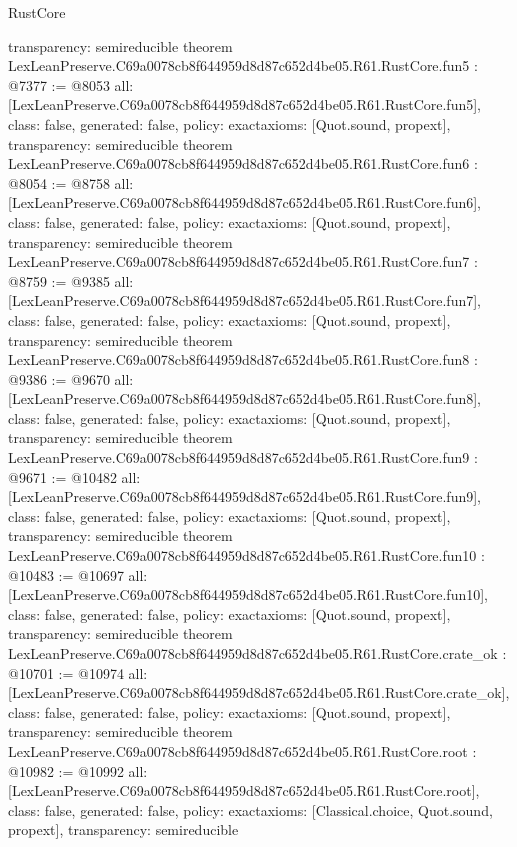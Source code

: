 \begin{lexlean}{RustCore}
\begin{coremodule}
{  transparency: semireducible
}
theorem LexLeanPreserve.C69a0078cb8f644959d8d87c652d4be05.R61.RustCore.fun5 : @7377 := @8053 {
  all: [LexLeanPreserve.C69a0078cb8f644959d8d87c652d4be05.R61.RustCore.fun5],
  class: false,
  generated: false,
  policy: exact{axioms: [Quot.sound, propext]},
  transparency: semireducible
}
theorem LexLeanPreserve.C69a0078cb8f644959d8d87c652d4be05.R61.RustCore.fun6 : @8054 := @8758 {
  all: [LexLeanPreserve.C69a0078cb8f644959d8d87c652d4be05.R61.RustCore.fun6],
  class: false,
  generated: false,
  policy: exact{axioms: [Quot.sound, propext]},
  transparency: semireducible
}
theorem LexLeanPreserve.C69a0078cb8f644959d8d87c652d4be05.R61.RustCore.fun7 : @8759 := @9385 {
  all: [LexLeanPreserve.C69a0078cb8f644959d8d87c652d4be05.R61.RustCore.fun7],
  class: false,
  generated: false,
  policy: exact{axioms: [Quot.sound, propext]},
  transparency: semireducible
}
theorem LexLeanPreserve.C69a0078cb8f644959d8d87c652d4be05.R61.RustCore.fun8 : @9386 := @9670 {
  all: [LexLeanPreserve.C69a0078cb8f644959d8d87c652d4be05.R61.RustCore.fun8],
  class: false,
  generated: false,
  policy: exact{axioms: [Quot.sound, propext]},
  transparency: semireducible
}
theorem LexLeanPreserve.C69a0078cb8f644959d8d87c652d4be05.R61.RustCore.fun9 : @9671 := @10482 {
  all: [LexLeanPreserve.C69a0078cb8f644959d8d87c652d4be05.R61.RustCore.fun9],
  class: false,
  generated: false,
  policy: exact{axioms: [Quot.sound, propext]},
  transparency: semireducible
}
theorem LexLeanPreserve.C69a0078cb8f644959d8d87c652d4be05.R61.RustCore.fun10 : @10483 := @10697 {
  all: [LexLeanPreserve.C69a0078cb8f644959d8d87c652d4be05.R61.RustCore.fun10],
  class: false,
  generated: false,
  policy: exact{axioms: [Quot.sound, propext]},
  transparency: semireducible
}
theorem LexLeanPreserve.C69a0078cb8f644959d8d87c652d4be05.R61.RustCore.crate_ok : @10701 := @10974 {
  all: [LexLeanPreserve.C69a0078cb8f644959d8d87c652d4be05.R61.RustCore.crate_ok],
  class: false,
  generated: false,
  policy: exact{axioms: [Quot.sound, propext]},
  transparency: semireducible
}
theorem LexLeanPreserve.C69a0078cb8f644959d8d87c652d4be05.R61.RustCore.root : @10982 := @10992 {
  all: [LexLeanPreserve.C69a0078cb8f644959d8d87c652d4be05.R61.RustCore.root],
  class: false,
  generated: false,
  policy: exact{axioms: [Classical.choice, Quot.sound, propext]},
  transparency: semireducible
}


\end{coremodule}
\end{lexlean}
